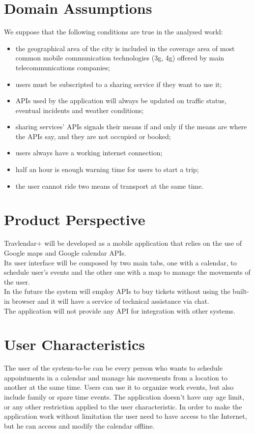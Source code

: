 \section{Domain Assumptions}
We suppose that the following conditions are true in the analysed world:
\begin{itemize}
\item the geographical area of the city is included in the coverage area of most common mobile communication technologies (3g, 4g) offered by main telecommunications companies;
\item users must be subscripted to a sharing service if they want to use it;
\item APIs used by the application will always be updated on traffic status, eventual incidents and weather conditions;
\item sharing services’ APIs signals their means if and only if the means are where the APIs say, and they are not occupied or booked;
\item users always have a working internet connection;
\item half an hour is enough warning time for users to start a trip;
\item the user cannot ride two means of transport at the same time.
\end{itemize}
%
\section{Product Perspective}
Travlendar+ will be developed as a mobile application that relies on the use of Google maps and Google calendar APIs. \\
Its user interface will be composed by two main tabs, one with a calendar, to schedule user's events and the other one with a map to manage the movements of the user. \\
In the future the system will employ APIs to buy tickets without using the built-in browser and it will have a service of technical assistance via chat. \\
The application will not provide any API for integration with other systems.
%
%
\section{User Characteristics}
The user of the system-to-be can be every person who wants to schedule appointments in a calendar and manage his movements from a location to another at the same time.
Users can use it to organize work events, but also include family or spare time events. The application doesn't have any age limit, or any other restriction applied to the user characteristic. In order to make the application work without limitation the user need to have access to the Internet, but he can access and modify the calendar offline.
%
